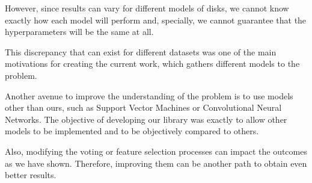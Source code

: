 However, since results can vary for different models of disks, we cannot know exactly how each model will perform and, specially, we cannot guarantee that the hyperparameters will be the same at all.

This discrepancy that can exist for different datasets was one of the main motivations for creating the current work, which gathers different models to the problem.

Another avenue to improve the understanding of the problem is to use models other than ours, such as Support Vector Machines or Convolutional Neural Networks.
The objective of developing our library was exactly to allow other models to be implemented and to be objectively compared to others.

Also, modifying the voting or feature selection processes can impact the outcomes as we have shown.
Therefore, improving them can be another path to obtain even better results.